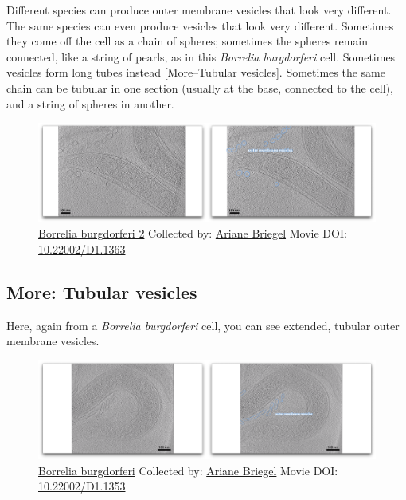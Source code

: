 \documentclass[]{tufte-book}
\begin{document}
Different species can produce outer membrane vesicles that look very
different. The same species can even produce vesicles that look very
different. Sometimes they come off the cell as a chain of spheres;
sometimes the spheres remain connected, like a string of pearls, as in
this \emph{Borrelia burgdorferi} cell. Sometimes vesicles form long
tubes instead {[}More--Tubular vesicles{]}. Sometimes the same chain can
be tubular in one section (usually at the base, connected to the cell),
and a string of spheres in another.





\begin{figure}
\includegraphics{movie_stills/2_4a} \caption[\protect\hyperlink{tree}{Borrelia burgdorferi 2} Collected
by: \protect\hyperlink{ariane_briegel}{Ariane Briegel} Movie DOI:
\href{https://doi.org/10.22002/D1.1363}{10.22002/D1.1363}]{\protect\hyperlink{tree}{Borrelia burgdorferi 2} Collected
by: \protect\hyperlink{ariane_briegel}{Ariane Briegel} Movie DOI:
\href{https://doi.org/10.22002/D1.1363}{10.22002/D1.1363}}\label{fig:2-4a}
\end{figure}

\hypertarget{Tubular_vesicles}{\subsection*{More: Tubular
vesicles}\label{Tubular_vesicles}}

Here, again from a \emph{Borrelia burgdorferi} cell, you can see
extended, tubular outer membrane vesicles.





\begin{figure}
\includegraphics{movie_stills/2_4b} \caption[\protect\hyperlink{tree}{Borrelia burgdorferi} Collected by:
\protect\hyperlink{ariane_briegel}{Ariane Briegel} Movie DOI:
\href{https://doi.org/10.22002/D1.1353}{10.22002/D1.1353}]{\protect\hyperlink{tree}{Borrelia burgdorferi} Collected by:
\protect\hyperlink{ariane_briegel}{Ariane Briegel} Movie DOI:
\href{https://doi.org/10.22002/D1.1353}{10.22002/D1.1353}}\label{fig:2-4b}
\end{figure}
\end{document}
